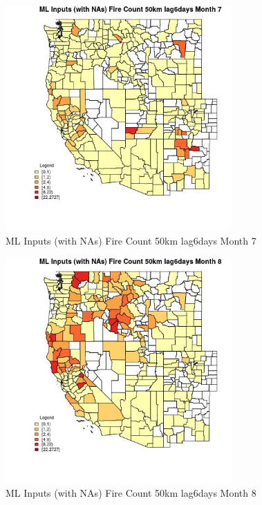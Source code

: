 \begin{figure} 
\centering  
\includegraphics[width=0.77\textwidth]{Code_Outputs/Report_ML_input_PM25_Step4_part_f_de_duplicated_aves_prioritize_24hr_obswNAs_CountyFire_Count_50km_lag6daysmedianMonth7.jpg} 
\caption{\label{fig:Report_ML_input_PM25_Step4_part_f_de_duplicated_aves_prioritize_24hr_obswNAsCountyFire_Count_50km_lag6daysmedianMonth7}ML Inputs (with NAs) Fire Count 50km lag6days Month 7} 
\end{figure} 
 

\begin{figure} 
\centering  
\includegraphics[width=0.77\textwidth]{Code_Outputs/Report_ML_input_PM25_Step4_part_f_de_duplicated_aves_prioritize_24hr_obswNAs_CountyFire_Count_50km_lag6daysmedianMonth8.jpg} 
\caption{\label{fig:Report_ML_input_PM25_Step4_part_f_de_duplicated_aves_prioritize_24hr_obswNAsCountyFire_Count_50km_lag6daysmedianMonth8}ML Inputs (with NAs) Fire Count 50km lag6days Month 8} 
\end{figure} 
 

